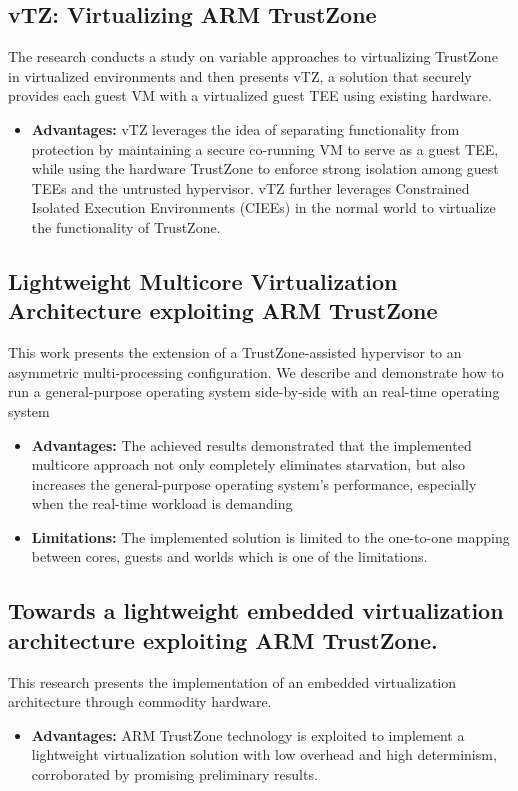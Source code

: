 \documentclass[conference]{IEEEtran}
\begin{document}
\subsection{vTZ: Virtualizing ARM TrustZone}
\cite{hyper7} The research conducts a study on variable approaches to virtualizing TrustZone in virtualized environments and then presents vTZ, a solution that securely provides each guest VM with a virtualized guest TEE using existing hardware.
\begin{itemize}
    \item \textbf{Advantages:} vTZ leverages the idea of separating functionality from protection by maintaining a secure co-running VM to serve as a guest TEE, while using the hardware TrustZone to enforce strong isolation among guest TEEs and the untrusted hypervisor. vTZ further leverages Constrained Isolated Execution Environments (CIEEs) in the normal world to virtualize the functionality of TrustZone.
\end{itemize}


\subsection{Lightweight Multicore Virtualization Architecture exploiting ARM TrustZone}
\cite{hyper8} This work presents the extension of a TrustZone-assisted hypervisor to an asymmetric multi-processing configuration. We describe and demonstrate how to run a general-purpose operating system side-by-side with an real-time operating system
\begin{itemize}
    \item \textbf{Advantages:} The achieved results demonstrated that the implemented multicore approach not only completely eliminates starvation, but also increases the general-purpose operating system’s performance, especially when the real-time workload is demanding
    \item \textbf{Limitations:} The implemented solution is limited to the one-to-one mapping between cores, guests and worlds which is one of the limitations.
\end{itemize}


\subsection{Towards a lightweight embedded virtualization architecture exploiting ARM TrustZone.}
\cite{hyper9} This research presents the implementation of an embedded virtualization architecture through commodity hardware.
\begin{itemize}
    \item \textbf{Advantages:} ARM TrustZone technology is exploited to implement a lightweight virtualization solution with low overhead and high determinism, corroborated by promising preliminary results.
\end{itemize}
\end{document}
